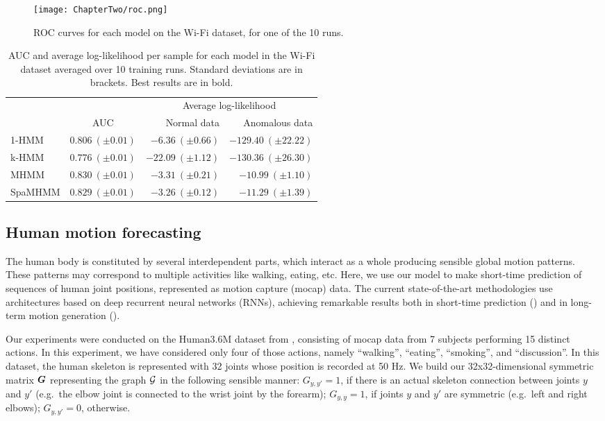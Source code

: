 \begin{figure}
    \centering
    \texttt{[image: ChapterTwo/roc.png]}
    \caption{ROC curves for each model on the Wi-Fi dataset, for one of the 10 runs.}
    \label{fig:spamhmm_wifi_roc}
\end{figure}

\begin{table}
    \centering
    \begin{tabular}{l|r|r r}
        \multicolumn{1}{c}{} & \multicolumn{1}{c}{} & \multicolumn{2}{|c}{Average log-likelihood} \\
        & \multicolumn{1}{c|}{AUC} & Normal data & Anomalous data \\
        \hline
        1-HMM & $0.806~(\pm 0.01)$ & $-6.36~(\pm 0.66)$ & $-129.40~(\pm 22.22)$ \\
        k-HMM & $0.776~(\pm 0.01)$ & $-22.09~(\pm 1.12)$ & $\mathbf{-130.36}~(\pm 26.30)$ \\
        MHMM & $\mathbf{0.830}~(\pm 0.01)$ & $-3.31~(\pm 0.21)$ & $-10.99~(\pm 1.10)$ \\
        SpaMHMM & $0.829~(\pm 0.01)$ & $\mathbf{-3.26}~(\pm 0.12)$ & $-11.29~(\pm 1.39)$ \\
    \end{tabular}
    \caption{AUC and average log-likelihood per sample for each model in the Wi-Fi dataset averaged over 10 training runs. Standard deviations are in brackets. Best results are in bold.}
    \label{tbl:spamhmm_wifi_results}
\end{table}

\subsection{Human motion forecasting}
\label{sec:h36m}
The human body is constituted by several interdependent parts, which interact as a whole producing sensible global motion patterns. These patterns may correspond to multiple activities like walking, eating, etc. Here, we use our model to make short-time prediction of sequences of human joint positions, represented as motion capture (mocap) data. The current state-of-the-art methodologies use architectures based on deep recurrent neural networks (RNNs), achieving remarkable results both in short-time prediction (\citet{Fragkiadaki2015, Martinez2017}) and in long-term motion generation (\citet{Jain2016, Pavllo2018}).

Our experiments were conducted on the Human3.6M dataset from \citet{Ionescu2011, Ionescu2014}, consisting of mocap data from 7 subjects performing 15 distinct actions. In this experiment, we have considered only four of those actions, namely ``walking'', ``eating'', ``smoking'', and ``discussion''. In this dataset, the human skeleton is represented with 32 joints whose position is recorded at 50 Hz. We build our 32x32-dimensional symmetric matrix ${\bm{G}}$ representing the graph ${\mathcal{G}}$ in the following sensible manner: $G_{y,y'}=1$, if there is an actual skeleton connection between joints $y$ and $y'$ (e.g.\  the elbow joint is connected to the wrist joint by the forearm); $G_{y,y}=1$, if joints $y$ and $y'$ are symmetric (e.g.\  left and right elbows); $G_{y,y'}=0$, otherwise.

